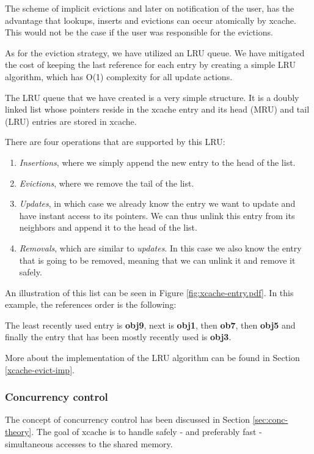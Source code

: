 The scheme of implicit evictions and later on notification of the user, has the 
advantage that lookups, inserts and evictions can occur atomically by xcache.  
This would not be the case if the user was responsible for the evictions.

As for the eviction strategy, we have utilized an LRU queue. We have mitigated 
the cost of keeping the last reference for each entry by creating a simple LRU 
algorithm, which has O(1) complexity for all update actions.

The LRU queue that we have created is a very simple structure. It is a doubly 
linked list whose pointers reside in the xcache entry and its head (MRU) and 
tail (LRU) entries are stored in xcache.

There are four operations that are supported by this LRU:

\begin{enumerate}
	\item \textit{Insertions}, where we simply append the new entry to the
		head of the list.
	\item \textit{Evictions}, where we remove the tail of the list.
	\item \textit{Updates}, in which case we already know the entry we want 
		to update and have instant access to its pointers.  We can thus 
		unlink this entry from its neighbors and append it to the head 
		of the list.
	\item \textit{Removals}, which are similar to \textit{updates}. In this 
		case we also know the entry that is going to be removed, 
		meaning that we can unlink it and remove it safely.
\end{enumerate}

An illustration of this list can be seen in Figure \ref{fig:xcache-entry.pdf}.  
In this example, the references order is the following:

The least recently used entry is \textbf{obj9}, next is \textbf{obj1}, then 
\textbf{ob7}, then \textbf{obj5} and finally the entry that has been mostly 
recently used is \textbf{obj3}.

More about the implementation of the LRU algorithm can be found in Section 
\ref{xcache-evict-imp}.

\subsubsection{Concurrency control}

The concept of concurrency control has been discussed in Section 
\ref{sec:conc-theory}.  The goal of xcache is to handle safely - and preferably 
fast - simultaneous accesses to the shared memory.

